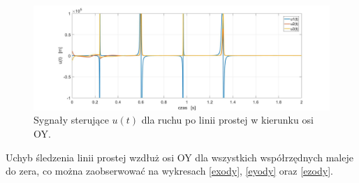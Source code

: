 \documentclass[eng,printmode]{mgr}
\begin{document}
\begin{figure}[!h]
\centering
\includegraphics[width=1\textwidth]{uody.jpg}
\caption{\label{uody}Sygnały sterujące $u(t)$ dla ruchu po linii prostej w kierunku osi OY.}
\end{figure}
\newpage


Uchyb śledzenia linii prostej wzdłuż osi OY dla wszystkich współrzędnych maleje do zera, co można zaobserwować na wykresach \ref{exody}, \ref{eyody} oraz \ref{ezody}.
\end{document}
